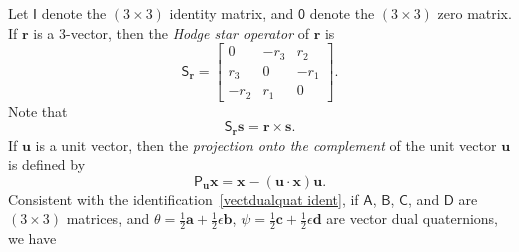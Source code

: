 \documentclass[reqno,12pt]{amsart}
\newcommand\starop[1]{\mathsf S_{#1}}
\begin{document}
Let $\mathsf I$ denote the $(3 \times 3)$ identity matrix, and $\mathsf 0$ denote the $(3 \times 3)$ zero matrix.  If $\bm r$ is a 3-vector, then the \emph{Hodge star operator} of $\bm r$ is
\begin{equation}
\starop{\bm r} = \begin{bmatrix}  0   & - r_3 &  r_2 \\
                               r_3 &  0   & - r_1 \\
                              - r_2 &  r_1 &  0 \end{bmatrix} .
\end{equation}
Note that
\begin{equation}
\label{r star to r cross}
\starop{\bm r} \bm s = \bm r \times \bm s .
\end{equation}
If $\bm u$ is a unit vector, then the \emph{projection onto the complement} of the unit vector $\bm u$ is defined by
\begin{equation}
\mathsf P_{\bm u} \bm x = \bm x - (\bm u \cdot \bm x) \bm u .
\end{equation}
Consistent with the identification~\eqref{vectdualquat ident}, if $\mathsf A$, $\mathsf B$, $\mathsf C$, and $\mathsf D$ are $(3 \times 3)$ matrices,  and $\theta = \tfrac12 \bm a + \tfrac12 \epsilon \bm b$, $\psi = \tfrac12 \bm c + \tfrac12 \epsilon \bm d$ are vector dual quaternions, we have
\end{document}

